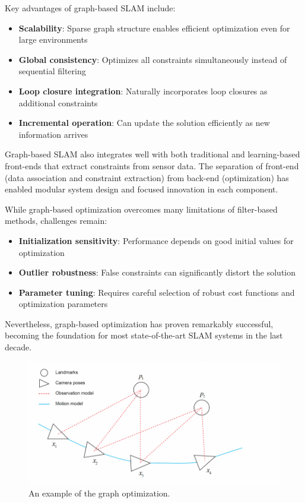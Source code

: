 \documentclass[12pt]{article}
\begin{document}
    Key advantages of graph-based SLAM include:
    \begin{itemize}
        \item \textbf{Scalability}: Sparse graph structure enables efficient optimization even for large environments
        \item \textbf{Global consistency}: Optimizes all constraints simultaneously instead of sequential filtering
        \item \textbf{Loop closure integration}: Naturally incorporates loop closures as additional constraints
        \item \textbf{Incremental operation}: Can update the solution efficiently as new information arrives
    \end{itemize}
    
    Graph-based SLAM also integrates well with both traditional and learning-based front-ends that extract constraints from sensor data. 
    The separation of front-end (data association and constraint extraction) from back-end (optimization) has enabled modular system design and focused innovation in each component.
    
    \newpage
    While graph-based optimization overcomes many limitations of filter-based methods, challenges remain:
    \begin{itemize}
        \item \textbf{Initialization sensitivity}: Performance depends on good initial values for optimization
        \item \textbf{Outlier robustness}: False constraints can significantly distort the solution
        \item \textbf{Parameter tuning}: Requires careful selection of robust cost functions and optimization parameters
    \end{itemize}
    
    Nevertheless, graph-based optimization has proven remarkably successful, becoming the foundation for most state-of-the-art SLAM systems in the last decade.
    
    \begin{figure}[h!]
        \centering
        \includegraphics[width=1.1\textwidth]{graph_based_optimization.png}
        \caption{An example of the graph optimization. \cite{graph_optimization_img}}
        \label{fig:D-EKF-SLAM-operation}
    \end{figure}
\end{document}
